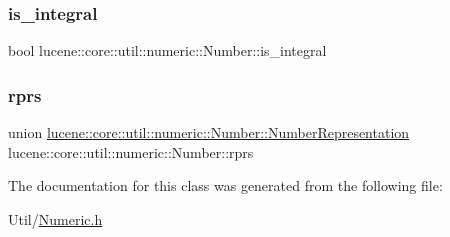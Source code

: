 \subsubsection{\texorpdfstring{is\+\_\+integral}{is\_integral}}
{\footnotesize\ttfamily bool lucene\+::core\+::util\+::numeric\+::\+Number\+::is\+\_\+integral\hspace{0.3cm}{\ttfamily [private]}}

\mbox{\label{classlucene_1_1core_1_1util_1_1numeric_1_1Number_a080da7ae6d9000a9c4433db59d668b10}} 
\subsubsection{\texorpdfstring{rprs}{rprs}}
{\footnotesize\ttfamily union \mbox{\hyperlink{unionlucene_1_1core_1_1util_1_1numeric_1_1Number_1_1NumberRepresentation}{lucene\+::core\+::util\+::numeric\+::\+Number\+::\+Number\+Representation}}  lucene\+::core\+::util\+::numeric\+::\+Number\+::rprs\hspace{0.3cm}{\ttfamily [private]}}



The documentation for this class was generated from the following file\+:\begin{DoxyCompactItemize}
\item 
Util/\mbox{\hyperlink{Numeric_8h}{Numeric.\+h}}\end{DoxyCompactItemize}
